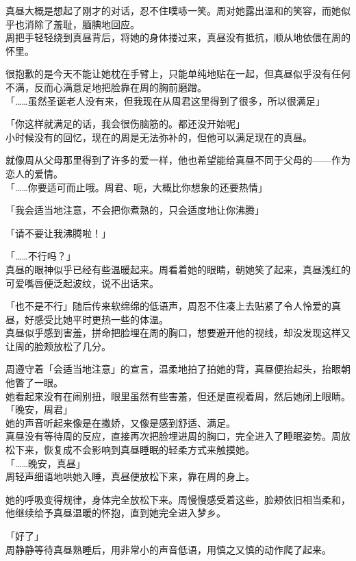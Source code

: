 真昼大概是想起了刚才的对话，忍不住噗哧一笑。周对她露出温和的笑容，而她似乎也消除了羞耻，腼腆地回应。\\

周把手轻轻绕到真昼背后，将她的身体搂过来，真昼没有抵抗，顺从地依偎在周的怀里。

很抱歉的是今天不能让她枕在手臂上，只能单纯地贴在一起，但真昼似乎没有任何不满，反而心满意足地把脸靠在周的胸前磨蹭。\\

「……虽然圣诞老人没有来，但我现在从周君这里得到了很多，所以很满足」

「你这样就满足的话，我会很伤脑筋的。都还没开始呢」\\

小时候没有的回忆，现在的周是无法弥补的，但他可以满足现在的真昼。

就像周从父母那里得到了许多的爱一样，他也希望能给真昼不同于父母的——作为恋人的爱情。\\

「……你要适可而止哦。周君、呃，大概比你想象的还要热情」

「我会适当地注意，不会把你煮熟的，只会适度地让你沸腾」

「请不要让我沸腾啦！」

「……不行吗？」\\

真昼的眼神似乎已经有些温暖起来。周看着她的眼睛，朝她笑了起来，真昼浅红的可爱嘴唇便泛起波纹，说不出话来。

「也不是不行」随后传来软绵绵的低语声，周忍不住凑上去贴紧了令人怜爱的真昼，好感受比她平时更热一些的体温。\\

真昼似乎感到害羞，拼命把脸埋在周的胸口，想要避开他的视线，却没发现这样又让周的脸颊放松了几分。

周遵守着「会适当地注意」的宣言，温柔地拍了拍她的背，真昼便抬起头，抬眼朝他瞥了一眼。\\

她看起来没有在闹别扭，眼里虽然有些害羞，但还是直视着周，然后她闭上眼睛。\\

「晚安，周君」\\

她的声音听起来像是在撒娇，又像是感到舒适、满足。\\

真昼没有等待周的反应，直接再次把脸埋进周的胸口，完全进入了睡眠姿势。周放松下来，恢复成不会影响到真昼睡眠的轻柔方式来触摸她。\\

「……晚安，真昼」\\

周轻声细语地哄她入睡，真昼便放松下来，靠在周的身上。

她的呼吸变得规律，身体完全放松下来。周慢慢感受着这些，脸颊依旧相当柔和，他继续给予真昼温暖的怀抱，直到她完全进入梦乡。\\

\vspace{2\baselineskip}

「好了」\\

周静静等待真昼熟睡后，用非常小的声音低语，用慎之又慎的动作爬了起来。
